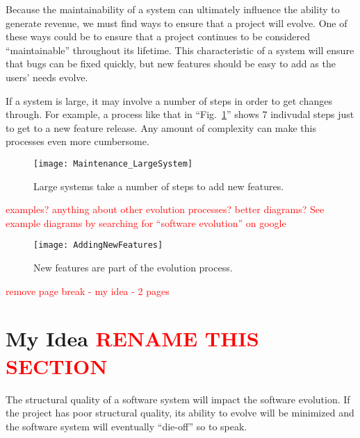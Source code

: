\documentclass[12pt,conference]{IEEEtran}
\newcommand\todo[1]{\textcolor{red}{#1}}
\begin{document}

Because the maintainability of a system can ultimately influence the ability to generate revenue, we must find ways to ensure that a project will evolve. One of these ways could be to ensure that a project continues to be considered ``maintainable'' throughout its lifetime. This characteristic of a system will ensure that bugs can be fixed quickly, but new features should be easy to add as the users' needs evolve.

If a system is large, it may involve a number of steps in order to get changes through. For example, a process like that in ``Fig.~\ref{figLargeSystemMaintenance}'' shows 7 indivudal steps just to get to a new feature release. Any amount of complexity can make this processes even more cumbersome.

\begin{figure}[ht]
    \centerline{
        \texttt{[image: Maintenance\_LargeSystem]}
    }
    \caption{Large systems take a number of steps to add new features.}
    \label{figLargeSystemMaintenance}
\end{figure}

\todo{examples? anything about other evolution processes? better diagrams?}
\todo{See example diagrams by searching for ``software evolution'' on google}

\begin{figure}[ht]
    \centerline{
        \texttt{[image: AddingNewFeatures]}
    }
    \caption{New features are part of the evolution process.}
    \label{figAddingNewFeatures}
\end{figure}

\newpage \todo{remove page break - my idea - 2 pages}

\section{My Idea \todo{RENAME THIS SECTION}}


The structural quality of a software system will impact the software evolution. If the project has poor structural quality, its ability to evolve will be minimized and the software system will eventually ``die-off'' so to speak.
\end{document}
